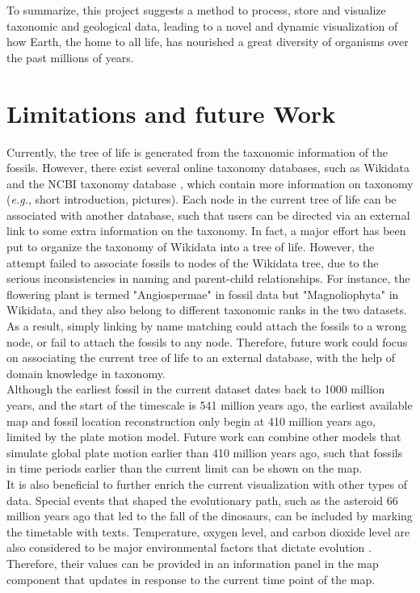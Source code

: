 \documentclass[11pt, a4paper,oneside,chapterprefix=false]{scrbook}
\begin{document}
To summarize, this project suggests a method to process, store and visualize taxonomic and geological data, leading to a novel and dynamic visualization of how Earth, the home to all life, has nourished a great diversity of organisms over the past millions of years.

\section{Limitations and future Work}
Currently, the tree of life is generated from the taxonomic information of the fossils. However, there exist several online taxonomy databases, such as Wikidata \cite{vrandevcic2014wikidata} and the NCBI taxonomy database \cite{federhen2012ncbi}, which contain more information on taxonomy (\emph{e.g.}, short introduction, pictures). Each node in the current tree of life can be associated with another database, such that users can be directed via an external link to some extra information on the taxonomy. In fact, a major effort has been put to organize the taxonomy of Wikidata into a tree of life. However, the attempt failed to associate fossils to nodes of the Wikidata tree, due to the serious inconsistencies in naming and parent-child relationships. For instance, the flowering plant is termed "Angiospermae" in fossil data but "Magnoliophyta" in Wikidata, and they also belong to different taxonomic ranks in the two datasets. As a result, simply linking by name matching could attach the fossils to a wrong node, or fail to attach the fossils to any node. Therefore, future work could focus on associating the current tree of life to an external database, with the help of domain knowledge in taxonomy.\\

Although the earliest fossil in the current dataset dates back to 1000 million years, and the start of the timescale is 541 million years ago, the earliest available map and fossil location reconstruction only begin at 410 million years ago, limited by the plate motion model. Future work can combine other models that simulate global plate motion earlier than 410 million years ago, such that fossils in time periods earlier than the current limit can be shown on the map. \\

It is also beneficial to further enrich the current visualization with other types of data. Special events that shaped the evolutionary path, such as the asteroid 66 million years ago that led to the fall of the dinosaurs, can be included by marking the timetable with texts. Temperature, oxygen level, and carbon dioxide level are also considered to be major environmental factors that dictate evolution \cite{butterfield2009oxygen, svenning2007ice}. Therefore, their values can be provided in an information panel in the map component that updates in response to the current time point of the map. 
\end{document}
